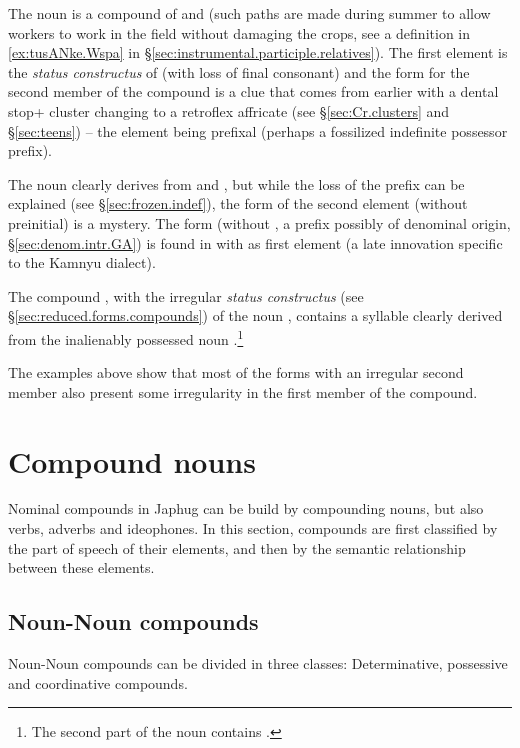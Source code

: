 The noun  is a compound of  and  (such paths are made during summer to allow workers to work in the field without damaging the crops, see a definition in \ref{ex:tusANke.Wspa} in §\ref{sec:instrumental.participle.relatives}). The first element  is the \textit{status constructus} of  (with loss of final consonant) and the form  for the second member of the compound is a clue that  comes from earlier  with a dental stop+ cluster changing to a retroflex affricate (see §\ref{sec:Cr.clusters} and §\ref{sec:teens}) -- the  element being prefixal (perhaps a fossilized indefinite possessor prefix).

The noun  clearly derives from  and , but while the loss of the  prefix can be explained (see §\ref{sec:frozen.indef}), the form of the second element (without  preinitial) is a mystery. The form  (without , a prefix possibly of denominal origin, §\ref{sec:denom.intr.GA}) is found in  with  as first element (a late innovation specific to the Kamnyu dialect).
 
 The compound , with the irregular \textit{status constructus}  (see §\ref{sec:reduced.forms.compounds}) of the noun , contains a syllable   clearly derived from the inalienably possessed noun .\footnote{The second part of the noun  contains . }  
 
The examples above show that most of the forms with an irregular second member also present some irregularity in the first member of the compound. 

\section{Compound nouns}
Nominal compounds in Japhug can be build by compounding nouns, but also verbs, adverbs and ideophones. In this section, compounds are first classified by the part of speech of their elements, and then by the semantic relationship between these elements.

\subsection{Noun-Noun compounds} \label{sec.n.n.compounds}
Noun-Noun compounds can be divided in three classes: Determinative, possessive and coordinative compounds.

